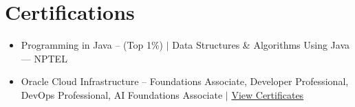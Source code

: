 \documentclass[letterpaper,10pt]{article}
\begin{document}
\vspace{-4pt}


\section{Certifications}

\begin{itemize}[leftmargin=*, itemsep=0pt, topsep=1pt]
\item Programming in Java -- (Top 1\%) $|$ Data Structures \& Algorithms Using Java --- NPTEL
\item Oracle Cloud Infrastructure -- Foundations Associate, Developer Professional, DevOps Professional, AI Foundations Associate $|$ \href{https://drive.google.com/drive/folders/1S_Az2zSxklRcdhTOYgDD-cATXJ7_UbE9?usp=sharing}{View Certificates}
\end{itemize}
\end{document}
